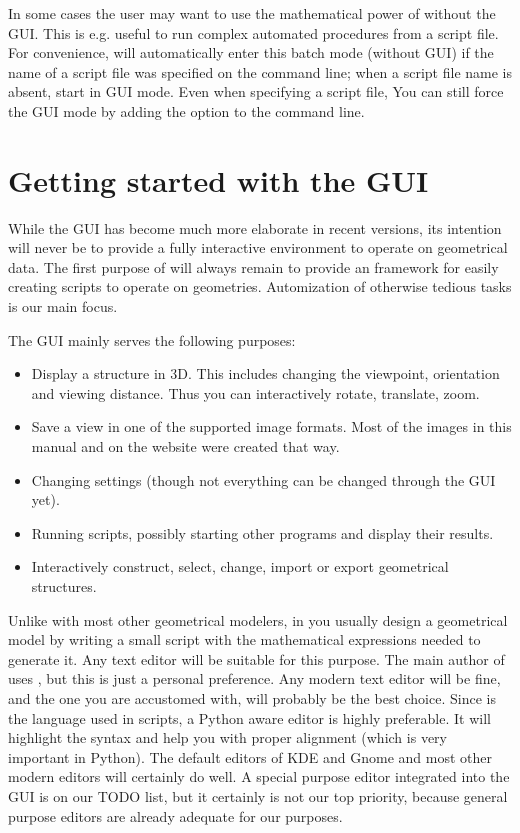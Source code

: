In some cases the user may want to use the mathematical power of \pyf without the GUI. This is e.g. useful to run complex automated procedures from a script file. For convenience, \pyf will automatically enter this batch mode (without GUI) if the name of a script file was specified on the command line; when a script file name is absent, \pyf start in GUI mode. Even when specifying a script file, You can still force the GUI mode by adding the option  to the command line.


\section{Getting started with the \pyformex GUI}
\label{sec:gui-tutorial}
While the \pyf GUI has become much more elaborate in recent versions, its intention will never be to provide a fully interactive environment to operate on geometrical data. The first purpose of \pyf will always remain to provide an framework for easily creating scripts to operate on geometries. Automization of otherwise tedious tasks is our main focus.

The GUI mainly serves the following purposes:
\begin{itemize}
\item Display a structure in 3D. This includes changing the viewpoint, orientation and viewing distance. Thus you can interactively rotate, translate, zoom.
\item Save a view in one of the supported image formats. Most of the images in this manual and on the \pyformex{} website were created that way. 
\item Changing \pyformex settings (though not everything can be changed through the GUI yet).
\item Running \pyformex scripts, possibly starting other programs and display their results.
\item Interactively construct, select, change, import or export geometrical structures. 
\end{itemize}

Unlike with most other geometrical modelers, in \pyf you usually design a geometrical model by writing a small script with the mathematical expressions needed to generate it. Any text editor will be suitable for this purpose. The main author of \pyf uses , but this is just a personal preference. Any modern text editor will be fine, and the one you are accustomed with, will probably be the best choice.
Since  is the language used in \pyformex scripts, a Python aware editor is highly preferable. It will highlight the syntax and help you with proper alignment (which is very important in Python).
The default editors of KDE and Gnome and most other modern editors will certainly do well. 
 A special purpose editor integrated into the \pyf GUI is on our TODO list, but it certainly is not our top priority, because general purpose editors are already adequate for our purposes. 

